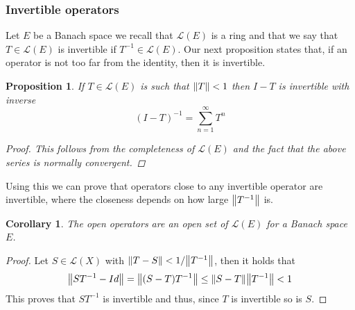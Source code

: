 \documentclass[12pt]{article}
\newtheorem{proposition}{Proposition}
\newtheorem{corollary}{Corollary}
\begin{document}
\subsubsection{Invertible operators}
Let $E$ be a Banach space we recall that $\mathcal{L}(E)$ is a ring and that we say that $T\in\mathcal{L}(E)$ is invertible if $T^{-1}\in\mathcal{L}(E)$. Our next proposition states that, if an operator is not too far from the identity, then it is invertible.
\begin{proposition}
	If $T\in\mathcal{L}(E)$ is such that $\norm{T}<1$ then $I-T$ is invertible with inverse
	\begin{equation*}
		(I-T)^{-1}=\sum_{n=1}^\infty T^n
	\end{equation*}
	\begin{proof}
		This follows from the completeness of $\mathcal{L}(E)$ and the fact that the above series is normally convergent.
	\end{proof}
\end{proposition}
Using this we can prove that operators close to any invertible operator are invertible, where the closeness depends on how large $\norm{T^{-1}}$ is.
\begin{corollary}
	The open operators are an open set of $\mathcal{L}(E)$ for a Banach space $E$.
\end{corollary}
\begin{proof}
	Let $S\in\mathcal{L}(X)$  with $\norm{T-S}<1/\norm{T^{-1}}$, then it holds that
	\begin{equation*}
		\norm{ST^{-1}-Id}=\norm{(S-T)T^{-1}}\leq\norm{S-T}\norm{T^{-1}}<1
	\end{equation*}
	This proves that $ST^{-1}$ is invertible and thus, since $T$ is invertible so is $S$.
\end{proof}
\end{document}
